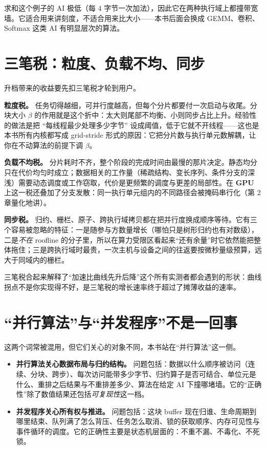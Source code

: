 \documentclass[12pt,a4paper,fontset=fandol]{ctexbook}
\newcommand{\Dom}[1]{\textsf{\bfseries #1}}
\newcommand{\GPU}{\Dom{GPU}}
\begin{document}
求和这个例子的 $\mathrm{AI}$ 极低（每 $4$ 字节一次加法），因此它在两种执行域上都撞带宽墙。它适合用来讲刻度，不适合用来比大小——本书后面会换成 GEMM、卷积、Softmax 这类 $\mathrm{AI}$ 有明显层次的算法。

\section{三笔税：粒度、负载不均、同步}

升档带来的收益要先扣三笔税才轮到用户。

\textbf{粒度税。} 任务切得越细，可并行度越高，但每个分片都要付一次启动与收尾。分块大小 $\beta$ 的作用就是这个折中：太大则尾部不均衡、小则同步占比上升。经验性的做法是把 ``每线程最少处理多少字节'' 设成阈值，低于它就不开线程——这也是本书所有内核都写成 grid-stride 形式的原因：它把分片数与执行单元数解耦，让你在不动算法的前提下调 $\beta$。

\textbf{负载不均税。} 分片耗时不齐，整个阶段的完成时间由最慢的那片决定。静态均分只在代价均匀时成立；数据相关的工作量（稀疏结构、变长序列、条件分支的深浅）需要动态调度或工作窃取，代价是更频繁的调度与更差的局部性。在 \GPU{} 上这一税还叠加了分支发散：同一执行单元组内的不同路径会被掩码串行化（第 2 章量化地讲）。

\textbf{同步税。} 归约、栅栏、原子、跨执行域拷贝都在把并行度换成顺序等待。它有三个容易被忽略的特征：一是随参与方数量增长（哪怕只是树形归约也有对数级），二是\emph{不在} roofline 的分子里，所以在算力受限区看起来``还有余量''时它依然能把整体拖住；三是跨执行域时最贵，一次主机与设备之间的往返要按微秒量级预算，远大于同域内的栅栏。

三笔税合起来解释了``加速比曲线先升后降''这个所有实测者都会遇到的形状：曲线拐点不是你实现得不好，是三笔税的增长速率终于超过了摊薄收益的速率。

\section{``并行算法''与``并发程序''不是一回事}

这两个词常被混用，但它们关心的对象不同，本书站在``并行算法''这一侧。

\begin{itemize}
\item \textbf{并行算法关心数据布局与归约结构。} 问题包括：数据以什么顺序被访问（连续、分块、跨步）、每次访问能带多少字节、归约算子是否可结合、单位元是什么、重排之后结果与不重排差多少、算法在给定 $\mathrm{AI}$ 下撞哪堵墙。它的``正确性''除了数值结果还包括\emph{可复现性}这一档。
\item \textbf{并发程序关心所有权与推进。} 问题包括：这块 buffer 现在归谁、生命周期到哪里结束、队列满了怎么背压、任务怎么取消、锁的获取顺序、内存可见性与事件循环的调度。它的正确性主要是状态机层面的：不重不漏、不毒化、不死锁。
\end{itemize}
\end{document}
